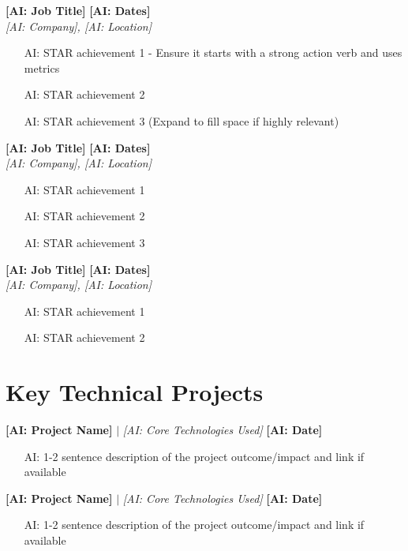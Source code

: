 \documentclass[letterpaper,10pt]{article}
\begin{document}
\noindent\textbf{[AI: Job Title]} \hfill \textbf{[AI: Dates]} \\
\textit{[AI: Company], [AI: Location]} 
\begin{itemize}
\item [AI: STAR achievement 1 - Ensure it starts with a strong action verb and uses metrics]
\item [AI: STAR achievement 2]
\item [AI: STAR achievement 3 (Expand to fill space if highly relevant)]
\end{itemize}

\noindent\textbf{[AI: Job Title]} \hfill \textbf{[AI: Dates]} \\
\textit{[AI: Company], [AI: Location]} 
\begin{itemize}
\item [AI: STAR achievement 1]
\item [AI: STAR achievement 2]
\item [AI: STAR achievement 3]
\end{itemize}

\noindent\textbf{[AI: Job Title]} \hfill \textbf{[AI: Dates]} \\
\textit{[AI: Company], [AI: Location]} 
\begin{itemize}
\item [AI: STAR achievement 1]
\item [AI: STAR achievement 2]
\end{itemize}

\section*{Key Technical Projects}

\noindent\textbf{[AI: Project Name]} $|$ \textit{[AI: Core Technologies Used]} \hfill \textbf{[AI: Date]} 
\begin{itemize}
\item [AI: 1-2 sentence description of the project outcome/impact and link if available]
\end{itemize}

\noindent\textbf{[AI: Project Name]} $|$ \textit{[AI: Core Technologies Used]} \hfill \textbf{[AI: Date]} 
\begin{itemize}
\item [AI: 1-2 sentence description of the project outcome/impact and link if available]
\end{itemize}
\end{document}
